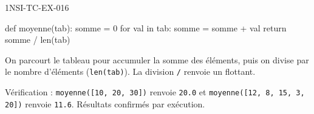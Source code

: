 \begin{corrige}{1NSI-TC-EX-016}
\begin{python}
def moyenne(tab):
    somme = 0
    for val in tab:
        somme = somme + val
    return somme / len(tab)
\end{python}

On parcourt le tableau pour accumuler la somme des éléments, puis on divise par le nombre d'éléments (\lstinline{len(tab)}). La division \lstinline{/} renvoie un flottant.

Vérification : \lstinline{moyenne([10, 20, 30])} renvoie \lstinline{20.0} et \lstinline{moyenne([12, 8, 15, 3, 20])} renvoie \lstinline{11.6}. Résultats confirmés par exécution.
\end{corrige}
